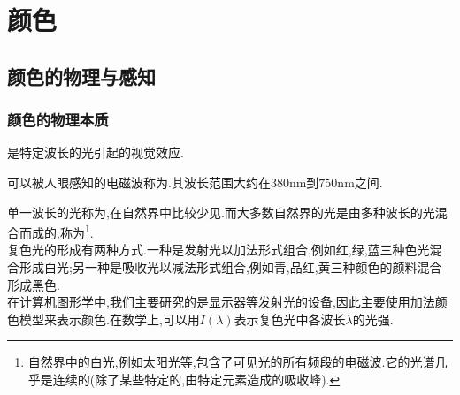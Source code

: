 \documentclass{ctexart}
\begin{document}
\section{颜色}
\subsection{颜色的物理与感知}
\subsubsection{颜色的物理本质}
\begin{definition}[颜色]
    是特定波长的光引起的视觉效应.
\end{definition}
\begin{definition}[可见光]
    可以被人眼感知的电磁波称为.其波长范围大约在$380\text{nm}$到$750\text{nm}$之间.
\end{definition}
单一波长的光称为,在自然界中比较少见.而大多数自然界的光是由多种波长的光混合而成的,称为\footnote{自然界中的白光,例如太阳光等,包含了可见光的所有频段的电磁波.它的光谱几乎是连续的(除了某些特定的,由特定元素造成的吸收峰).}.\\
\indent 复色光的形成有两种方式.一种是发射光以加法形式组合,例如红,绿,蓝三种色光混合形成白光;另一种是吸收光以减法形式组合,例如青,品红,黄三种颜色的颜料混合形成黑色.\\
\indent 在计算机图形学中,我们主要研究的是显示器等发射光的设备,因此主要使用加法颜色模型来表示颜色.在数学上,可以用$I(\lambda)$表示复色光中各波长$\lambda$的光强.
\end{document}
